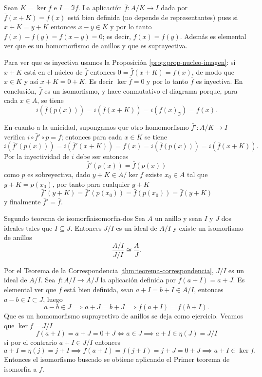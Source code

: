 \begin{proofbox}
Sean $K = \ker f$ e $I = \Im f$. La aplicación $\bar{f} : A/K \to I$ dada por $\bar{f}(x + K) = f(x)$ está bien definida (no depende de representantes) pues si $x + K = y + K$ entonces $x - y \in K$ y por lo tanto $f(x) - f(y) = f(x - y) = 0$; es decir, $f(x) = f(y)$. Además es elemental ver que es un homomorfismo de anillos y que es suprayectiva.

Para ver que es inyectiva usamos la Proposición \ref{prop:prop-nucleo-imagen}: si $x + K$ está en el núcleo de $\bar{f}$ entonces $0 = \bar{f}(x + K) = f(x)$, de modo que $x \in K$ y así $x + K = 0 + K$. Es decir $\ker \bar{f} = 0$ y por lo tanto $\bar{f}$ es inyectiva. En conclusión, $\bar{f}$ es un isomorfismo, y hace conmutativo el diagrama porque, para cada $x \in A$, se tiene
\[
i(\bar{f}(p(x))) = i(\bar{f}(x + K)) = i(f(x)_{\Im}) = f(x).
\]

En cuanto a la unicidad, supongamos que otro homomorfismo $\bar{f}' : A/K \to I$ verifica $i \circ \bar{f}' \circ p = f$; entonces para cada $x \in K$ se tiene 
\[
i(\bar{f}'(p(x))) = i(\bar{f}'(x + K)) = f(x) = i(\bar{f}(p(x))) = i(\bar{f}(x + K)).
\]
Por la inyectividad de $i$ debe ser entonces
\[
\bar{f}'(p(x)) = \bar{f}(p(x))
\]
como $p$ es sobreyectiva, dado $y + K \in A/\ker f$ existe $x_0 \in A$ tal que $y + K = p(x_0)$, por tanto para cualquier $y + K$
\[
\bar{f}'(y + K) = \bar{f}'(p(x_0)) = \bar{f}(p(x_0)) = \bar{f}(y + K)
\]
y finalmente $\bar{f}' = \bar{f}$.
\end{proofbox}

\begin{theorem}{Segundo teorema de isomorfía}{isomorfia-dos}
Sea $A$ un anillo y sean $I$ y $J$ dos ideales tales que $I \subseteq J$. Entonces $J/I$ es un ideal de $A/I$ y existe un isomorfismo de anillos
\[
\frac{A/I}{J/I} \cong \frac{A}{J}.
\]
\end{theorem}

\begin{proofbox}
Por el Teorema de la Correspondencia \ref{thm:teorema-correspondencia}, $J/I$ es un ideal de $A/I$. Sea $f : A/I \to A/J$ la aplicación definida por $f(a + I) = a + J$. Es elemental ver que $f$ está bien definida, sean $a + I = b + I \in A/I$, entonces $a-b \in I \subset J$, luego
\[
a - b \in J \implies a + J = b + J \implies f(a + I) = f(b + I).
\]
Que es un homomorfismo suprayectivo de anillos se deja como ejercicio. Veamos que $\ker f = J/I$
\[
f(a+I) = a + J = 0 + J \iff a \in J \implies a + I \in \eta(J) = J/I
\]
si por el contrario $a + I \in J/I$ entonces
\[
a + I = \eta(j) = j + I \implies f(a + I) = f(j + I) = j + J = 0 + J \implies a + I \in \ker f.
\]
Entonces el isomorfismo buscado se obtiene aplicando el Primer teorema de isomorfía a $f$.
\end{proofbox}

